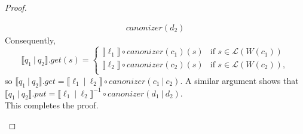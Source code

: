 \documentclass[acmsmall,review,anonymous]{acmart}
\newcommand{\kw}[1]{\ensuremath{\mathit{#1}}}
\newcommand{\sep}{\ensuremath{\ | \ }}
\newcommand{\canonizer}{\ensuremath{\kw{canonizer}}}
\newcommand{\get}{\ensuremath{\kw{get}}}
\newcommand{\lput}{\ensuremath{\kw{put}}}
\begin{document}
\begin{proof}
\begin{enumerate}
\begin{align*}
\canonizer(d_2)
\end{align*}
Consequently,
$$
\llbracket q_1 \sep q_2 \rrbracket.\get(s) =
\begin{cases}
\llbracket \ell_1 \rrbracket \circ
\canonizer(c_1) (s) & \text{if } s \in \mathcal{L}(W(c_1))\\
\llbracket \ell_2 \rrbracket \circ
\canonizer(c_2) (s) & \text{if } s \in \mathcal{L}(W(c_2)),\\
\end{cases}$$
so $\llbracket q_1 \sep q_2 \rrbracket.\get = \llbracket \ell_1 \sep
\ell_2 \rrbracket \circ \canonizer(c_1 \sep c_2)$. A similar argument shows
that $\llbracket q_1 \sep q_2 \rrbracket.\lput = \llbracket \ell_1 \sep
\ell_2 \rrbracket^{-1} \circ \canonizer(d_1 \sep d_2)$.\\
This completes the proof.
\end{enumerate}
\end{proof}




\end{document}
